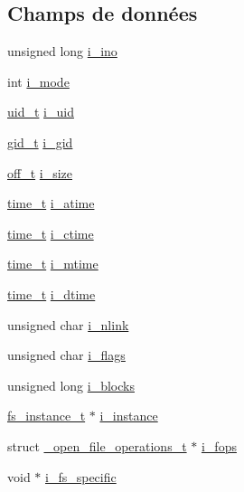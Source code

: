 \subsection*{Champs de données}
\begin{DoxyCompactItemize}
\item 
unsigned long \hyperlink{struct__inode__t_aba602b843ba63a32ca3950dbaf7e959c}{i\-\_\-ino}
\item 
int \hyperlink{struct__inode__t_acead4732b6c22ef17ada59203509e728}{i\-\_\-mode}
\item 
\hyperlink{kstat_8h_af2306308627701b66dc6f3babe821ab4}{uid\-\_\-t} \hyperlink{struct__inode__t_a7ddcb65050ac0b4c9cfbacd495d56f4b}{i\-\_\-uid}
\item 
\hyperlink{kstat_8h_aa7352f1065fe606194d792e2b292cf83}{gid\-\_\-t} \hyperlink{struct__inode__t_a95d052a6e9b1b1e4f6837fa0f33b393e}{i\-\_\-gid}
\item 
\hyperlink{libc_2include_2sys_2types_8h_a447a6a64dbb8fb44b1e62856b333db4a}{off\-\_\-t} \hyperlink{struct__inode__t_aed37b31c96c90873201abfc8b4b3e463}{i\-\_\-size}
\item 
\hyperlink{time_8h_aaaf414ca0598a3633e6e9161cbb5a58a}{time\-\_\-t} \hyperlink{struct__inode__t_a01f50c6c44a3b50e4414a794643b741f}{i\-\_\-atime}
\item 
\hyperlink{time_8h_aaaf414ca0598a3633e6e9161cbb5a58a}{time\-\_\-t} \hyperlink{struct__inode__t_a73ee1e604547b74b8e1045fd4f6699b6}{i\-\_\-ctime}
\item 
\hyperlink{time_8h_aaaf414ca0598a3633e6e9161cbb5a58a}{time\-\_\-t} \hyperlink{struct__inode__t_a331d724391efce2f89aeb1a503ae5c43}{i\-\_\-mtime}
\item 
\hyperlink{time_8h_aaaf414ca0598a3633e6e9161cbb5a58a}{time\-\_\-t} \hyperlink{struct__inode__t_a393de4c58241168fdf397ab8421a3539}{i\-\_\-dtime}
\item 
unsigned char \hyperlink{struct__inode__t_a929fc1e6837d02a2525027a121b4e67e}{i\-\_\-nlink}
\item 
unsigned char \hyperlink{struct__inode__t_a36ff48a57a9e483d74682972d31ef46c}{i\-\_\-flags}
\item 
unsigned long \hyperlink{struct__inode__t_a92ebe4c1e93af9fba4efae4d07e14858}{i\-\_\-blocks}
\item 
\hyperlink{vfs_8h_a0eefa9aac35a5462ebf1e038992ca860}{fs\-\_\-instance\-\_\-t} $\ast$ \hyperlink{struct__inode__t_affefc88b22f45e2ec8340d582486d0f2}{i\-\_\-instance}
\item 
struct \hyperlink{struct__open__file__operations__t}{\-\_\-open\-\_\-file\-\_\-operations\-\_\-t} $\ast$ \hyperlink{struct__inode__t_acf149d7d1601f78142b1eec480badf7e}{i\-\_\-fops}
\item 
void $\ast$ \hyperlink{struct__inode__t_a54e34439c448c46bae90fd040dadc5c0}{i\-\_\-fs\-\_\-specific}
\end{DoxyCompactItemize}


